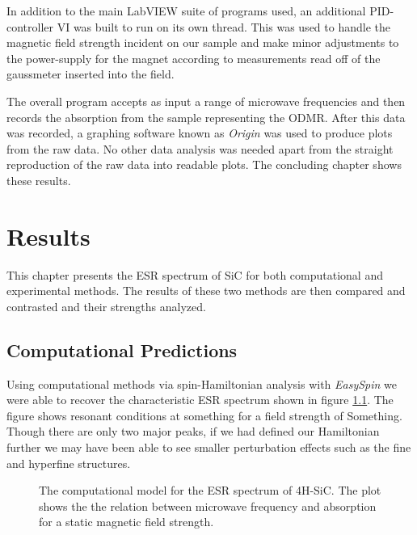 \documentclass[oneside, astronomy, noacknowlegments]{BYUPhys}
\begin{document}
In addition to the main LabVIEW suite of programs used, an additional PID-controller VI was built to run on its own thread. This was used to handle the magnetic field strength incident on our sample and make minor adjustments to the power-supply for the magnet according to measurements read off of the gaussmeter inserted into the field.

The overall program accepts as input a range of microwave frequencies and then records the absorption from the sample representing the ODMR. After this data was recorded, a graphing software known as \textit{Origin} was used to produce plots from the raw data. No other data analysis was needed apart from the straight reproduction of the raw data into readable plots. The concluding chapter shows these results.










\chapter{Results}

This chapter presents the ESR spectrum of SiC for both computational and experimental methods. The results of these two methods are then compared and contrasted and their strengths analyzed.

\section{Computational Predictions}

Using computational methods via spin-Hamiltonian analysis with \textit{EasySpin} we were able to recover the characteristic ESR spectrum shown in figure \ref{fig:SiCModel}. The figure shows resonant conditions at something for a field strength of Something. Though there are only two major peaks, if we had defined our Hamiltonian further we may have been able to see smaller perturbation effects such as the fine and hyperfine structures.

\begin{figure}
    \caption[ESR computational model for SiC]{\label{fig:SiCModel}
     The computational model for the ESR spectrum of 4H-SiC. The plot shows the the relation between microwave frequency and absorption for a static magnetic field strength.}
 \end{figure}
\end{document}
